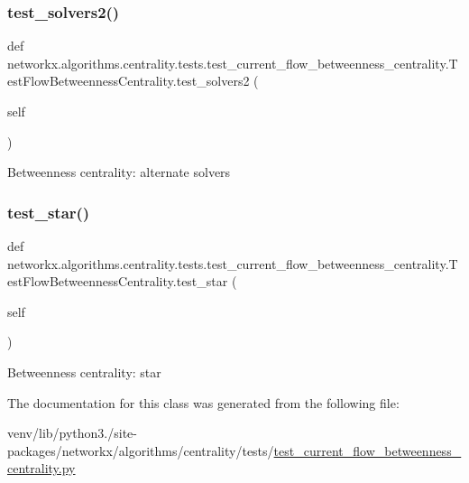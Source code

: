 \subsubsection{\texorpdfstring{test\+\_\+solvers2()}{test\_solvers2()}}
{\footnotesize\ttfamily def networkx.\+algorithms.\+centrality.\+tests.\+test\+\_\+current\+\_\+flow\+\_\+betweenness\+\_\+centrality.\+Test\+Flow\+Betweenness\+Centrality.\+test\+\_\+solvers2 (\begin{DoxyParamCaption}\item[{}]{self }\end{DoxyParamCaption})}

\begin{DoxyVerb}Betweenness centrality: alternate solvers\end{DoxyVerb}
 \mbox{\label{classnetworkx_1_1algorithms_1_1centrality_1_1tests_1_1test__current__flow__betweenness__centrali4423af8433073615a8a3f6b60e6093bd_a71f96ea76efe5f1bbed76e42ffaeafcb}} 
\subsubsection{\texorpdfstring{test\+\_\+star()}{test\_star()}}
{\footnotesize\ttfamily def networkx.\+algorithms.\+centrality.\+tests.\+test\+\_\+current\+\_\+flow\+\_\+betweenness\+\_\+centrality.\+Test\+Flow\+Betweenness\+Centrality.\+test\+\_\+star (\begin{DoxyParamCaption}\item[{}]{self }\end{DoxyParamCaption})}

\begin{DoxyVerb}Betweenness centrality: star\end{DoxyVerb}
 

The documentation for this class was generated from the following file\+:\begin{DoxyCompactItemize}
\item 
venv/lib/python3./site-\/packages/networkx/algorithms/centrality/tests/\hyperlink{test__current__flow__betweenness__centrality_8py}{test\+\_\+current\+\_\+flow\+\_\+betweenness\+\_\+centrality.\+py}\end{DoxyCompactItemize}
